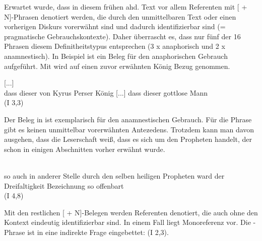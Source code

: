 Erwartet wurde, dass in diesem frühen ahd. Text vor allem Referenten mit [ + N]-Phrasen denotiert werden, die durch den unmittelbaren Text oder einen vorherigen Diskurs vorerwähnt sind und dadurch identifizierbar sind (= pragmatische Gebrauchskontexte). Daher überrascht es, dass nur fünf der 16 Phrasen diesem Definitheitstypus entsprechen (3 x anaphorisch und 2 x anamnestisch). In Beispiel  ist ein Beleg für den  anaphorischen Gebrauch aufgeführt. Mit  wird auf einen  zuvor erwähnten König Bezug genommen.  

%

\begin{exe}
\ex \label{ex:I1051} \gll  {}       [...]     \\
{dass} {dieser} {von} {Kyrus} {Perser} {König} [...] {dass} {dieser} {gottlose} {Mann} \\
\glt   {} (I 3,3)
\end{exe}

Der Beleg in  ist exemplarisch für den anamnestischen Gebrauch. Für die Phrase  gibt es keinen unmittelbar vorerwähnten Antezedens. Trotzdem kann man davon ausgehen, dass die Leserschaft weiß, dass es sich um den Propheten handelt, der schon in einigen Abschnitten vorher erwähnt wurde.
%

\begin{exe}
\ex \label{ex:I2524} \gll {}                 \\
{so} {auch} {in} {anderer} {Stelle} {durch} {den} {selben} {heiligen} {Propheten} {ward} {der} {Dreifaltigkeit} {Bezeichnung} {so} {offenbart} \\
\glt   {} (I 4,8)
\end{exe}

Mit den restlichen [ + N]-Belegen werden Referenten denotiert, die auch ohne den Kontext eindeutig identifizierbar sind. In einem Fall liegt Monoreferenz vor. Die -Phrase ist in eine indirekte Frage eingebettet:   (I 2,3). 

